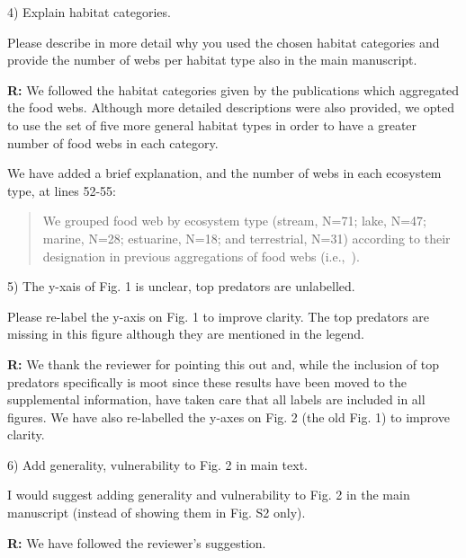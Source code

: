 \documentclass[12pt]{letter}
\newenvironment{refquote}{\bigskip \begin{it}}{\end{it}\smallskip}
\begin{document}
  4) Explain habitat categories.

  \begin{refquote}

    Please describe in more detail why you used the chosen habitat categories
    and provide the number of webs per habitat type also in the main
    manuscript.

  \end{refquote}


  \textbf{R:} We followed the habitat categories given by the publications which
  aggregated the food webs. Although more detailed descriptions were also provided, 
  we opted to use the set of five more general habitat types in order to have a 
  greater number of food webs in each category.


  We have added a brief explanation, and the number of webs in each ecosystem type, at lines 52-55:

  \begin{quotation}
    We grouped food web by ecosystem type (stream, N=71; lake, N=47; marine, N=28; estuarine, N=18;
    and terrestrial, N=31) according to their designation in previous aggregations of food webs 
    (i.e.,~\citet{GlobalWeb,Riede2011,Dunne2013}).
    
  \end{quotation}


  5) The y-xais of Fig. 1 is unclear, top predators are unlabelled.


  \begin{refquote}

    Please re-label the y-axis on Fig. 1 to improve clarity. The top predators
    are missing in this figure although they are mentioned in the legend.

  \end{refquote}


  \textbf{R:} We thank the reviewer for pointing this out 
  and, while the inclusion of top predators specifically
  is moot since these results have been moved to the 
  supplemental information, have taken care that all labels
  are included in all figures. We have also re-labelled the
  y-axes on Fig. 2 (the old Fig. 1) to improve clarity.


  6) Add generality, vulnerability to Fig. 2 in main text.


  \begin{refquote}

    I would suggest adding generality and vulnerability to Fig. 2 in the main
    manuscript (instead of showing them in Fig. S2 only).

  \end{refquote}


  \textbf{R:} We have followed the reviewer's suggestion.


  \newpage



\end{document}
